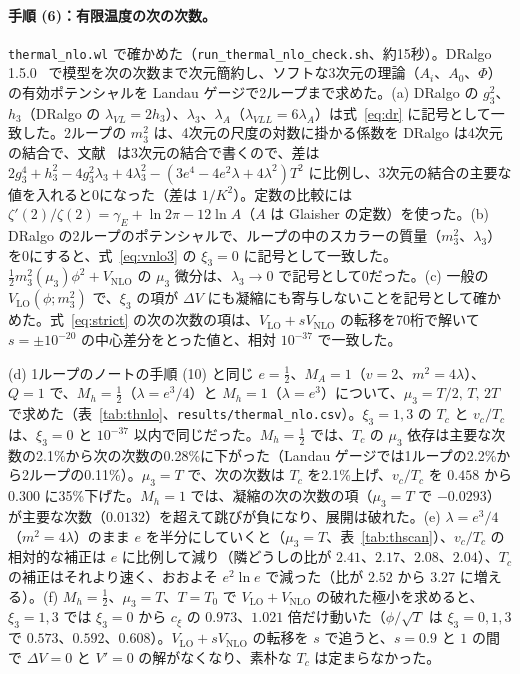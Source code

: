 \documentclass[a4paper,10pt]{ltjsarticle}
\begin{document}
\paragraph{手順 (6)：有限温度の次の次数。}\texttt{thermal\_nlo.wl} で確かめた（\texttt{run\_thermal\_nlo\_check.sh}、約15秒）。DRalgo 1.5.0~\cite{dralgo} で模型を次の次数まで次元簡約し、ソフトな3次元の理論（$A_i$、$A_0$、$\Phi$）の有効ポテンシャルを Landau ゲージで2ループまで求めた。(a) DRalgo の $g_3^2$、$h_3$（DRalgo の $\lambda_{VL}=2h_3$）、$\lambda_3$、$\lambda_A$（$\lambda_{VLL}=6\lambda_A$）は式~\eqref{eq:dr} に記号として一致した。2ループの $m_3^2$ は、4次元の尺度の対数に掛かる係数を DRalgo は4次元の結合で、文献~\cite{kklp98} は3次元の結合で書くので、差は $2g_3^4+h_3^2-4g_3^2\lambda_3+4\lambda_3^2-(3e^4-4e^2\lambda+4\lambda^2)T^2$ に比例し、3次元の結合の主要な値を入れると0になった（差は $1/K^2$）。定数の比較には $\zeta'(2)/\zeta(2)=\gamma_E+\ln2\pi-12\ln A$（$A$ は Glaisher の定数）を使った。(b) DRalgo の2ループのポテンシャルで、ループの中のスカラーの質量（$m_3^2$、$\lambda_3$）を0にすると、式~\eqref{eq:vnlo3} の $\xi_3=0$ に記号として一致した。$\frac12m_3^2(\mu_3)\phi^2+V_{\mathrm{NLO}}$ の $\mu_3$ 微分は、$\lambda_3\to0$ で記号として0だった。(c) 一般の $V_{\mathrm{LO}}(\phi;m_3^2)$ で、$\xi_3$ の項が $\Delta V$ にも凝縮にも寄与しないことを記号として確かめた。式~\eqref{eq:strict} の次の次数の項は、$V_{\mathrm{LO}}+sV_{\mathrm{NLO}}$ の転移を70桁で解いて $s=\pm10^{-20}$ の中心差分をとった値と、相対 $10^{-37}$ で一致した。

(d) 1ループのノートの手順 (10) と同じ $e=\frac12$、$M_A=1$（$v=2$、$m^2=4\lambda$）、$Q=1$ で、$M_h=\frac12$（$\lambda=e^3/4$）と $M_h=1$（$\lambda=e^3$）について、$\mu_3=T/2,\,T,\,2T$ で求めた（表~\ref{tab:thnlo}、\texttt{results/thermal\_nlo.csv}）。$\xi_3=1,3$ の $T_c$ と $v_c/T_c$ は、$\xi_3=0$ と $10^{-37}$ 以内で同じだった。$M_h=\frac12$ では、$T_c$ の $\mu_3$ 依存は主要な次数の2.1\%から次の次数の0.28\%に下がった（Landau ゲージでは1ループの2.2\%から2ループの0.11\%）。$\mu_3=T$ で、次の次数は $T_c$ を2.1\%上げ、$v_c/T_c$ を $0.458$ から $0.300$ に35\%下げた。$M_h=1$ では、凝縮の次の次数の項（$\mu_3=T$ で $-0.0293$）が主要な次数（$0.0132$）を超えて跳びが負になり、展開は破れた。(e) $\lambda=e^3/4$（$m^2=4\lambda$）のまま $e$ を半分にしていくと（$\mu_3=T$、表~\ref{tab:thscan}）、$v_c/T_c$ の相対的な補正は $e$ に比例して減り（隣どうしの比が $2.41$、$2.17$、$2.08$、$2.04$）、$T_c$ の補正はそれより速く、おおよそ $e^2\ln e$ で減った（比が $2.52$ から $3.27$ に増える）。(f) $M_h=\frac12$、$\mu_3=T$、$T=T_0$ で $V_{\mathrm{LO}}+V_{\mathrm{NLO}}$ の破れた極小を求めると、$\xi_3=1,3$ では $\xi_3=0$ から $c_\xi$ の $0.973$、$1.021$ 倍だけ動いた（$\phi/\sqrt T$ は $\xi_3=0,1,3$ で $0.573$、$0.592$、$0.608$）。$V_{\mathrm{LO}}+sV_{\mathrm{NLO}}$ の転移を $s$ で追うと、$s=0.9$ と $1$ の間で $\Delta V=0$ と $V'=0$ の解がなくなり、素朴な $T_c$ は定まらなかった。
\end{document}
